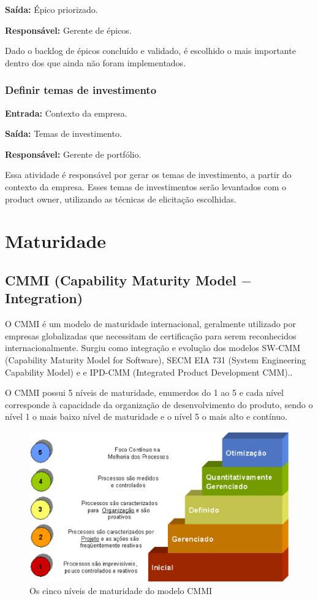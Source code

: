     \textbf{Saída:} Épico priorizado.

    \textbf{Responsável:} Gerente de épicos.
    
    Dado o backlog de épicos concluído e validado, é escolhido o mais importante dentro dos que ainda não foram implementados.

  \subsubsection{Definir temas de investimento}
    \textbf{Entrada:} Contexto da empresa.

    \textbf{Saída:} Temas de investimento.

    \textbf{Responsável:} Gerente de portfólio.
    
    Essa atividade é responsável por gerar os temas de investimento, a partir do contexto da empresa. Esses temas de investimentos serão levantados com o product owner, utilizando as técnicas de elicitação escolhidas.

\section{Maturidade}

\subsection{CMMI (Capability Maturity Model $-$ Integration)}

  O CMMI é um modelo de maturidade internacional, geralmente utilizado por empresas
  globalizadas que necessitam de certificação para serem reconhecidos internacionalmente.
  Surgiu como integração e evolução dos modelos SW-CMM (Capability Maturity Model for Software),
  SECM EIA 731 (System Engineering Capability Model) e  e IPD-CMM
  (Integrated Product Development CMM).\cite{mct2006}.

  O CMMI possui 5 níveis de maturidade, enumerdos do 1 ao 5 e cada nível corresponde
  à capacidade da organização de desenvolvimento do produto, sendo o nível 1 o mais
  baixo nível de maturidade e o nível 5 o mais alto e contínuo.

  \begin{figure}[!ht]
    \centering
    \includegraphics[width=15cm, keepaspectratio=true]{figuras/maturidade/niveis-cmmi.eps}
    \caption{Os cinco níveis de maturidade do modelo CMMI}
  \end{figure}

